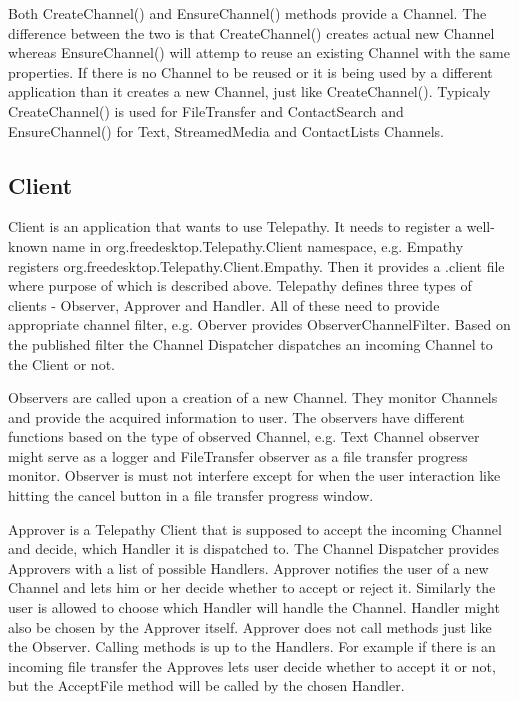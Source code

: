 Both CreateChannel() and EnsureChannel() methods provide a Channel. The difference between the two is that CreateChannel() creates actual new Channel whereas EnsureChannel() will attemp to reuse an existing Channel with the same properties. If there is no Channel to be reused or it is being used by a different application than it creates a new Channel, just like CreateChannel(). Typicaly CreateChannel() is used for FileTransfer and ContactSearch and EnsureChannel() for Text, StreamedMedia and ContactLists Channels.\cite{tpWikiRequestingChannels} 

\subsection*{Client}\label{subsect:tpClient}
Client is an application that wants to use Telepathy. It needs to register a well-known name in org.freedesktop.Telepathy.Client namespace, e.g. Empathy registers org.freedesktop.Telepathy.Client.Empathy. Then it provides a .client file where purpose of which is described above. Telepathy defines three types of clients - Observer, Approver and Handler. All of these need to provide appropriate channel filter, e.g. Oberver provides ObserverChannelFilter. Based on the published filter the Channel Dispatcher dispatches an incoming Channel to the Client or not.\cite{tpWikiClient}  

Observers are called upon a creation of a new Channel. They monitor Channels and provide the acquired information to user. The observers have different functions based on the type of observed Channel, e.g. Text Channel observer might serve as a logger and FileTransfer observer as a file transfer progress monitor. Observer is must not interfere except for when the user interaction like hitting the cancel button in a file transfer progress window.\cite{tpWikiClient}     

Approver is a Telepathy Client that is supposed to accept the incoming Channel and decide, which Handler it is dispatched to. The Channel Dispatcher provides Approvers with a list of possible Handlers. Approver notifies the user of a new Channel and lets him or her decide whether to accept or reject it. Similarly the user is allowed to choose which Handler will handle the Channel. Handler might also be chosen by the Approver itself. Approver does not call methods just like the Observer. Calling methods is up to the Handlers. For example if there is an incoming file transfer the Approves lets user decide whether to accept it or not, but the AcceptFile method will be called by the chosen Handler.\cite{tpWikiClient}  

